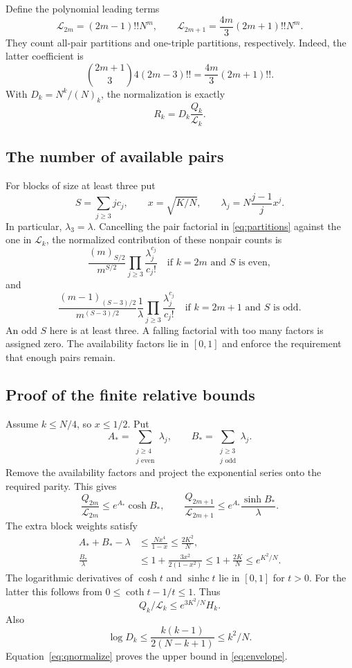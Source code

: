 \documentclass[11pt]{article}
\theoremstyle{definition}
\theoremstyle{remark}
\newcommand{\1}{\mathbf 1}
\newcommand{\shc}{\operatorname{sinhc}}
\begin{document}
Define the polynomial leading terms
\[
\mathcal L_{2m}=(2m-1)!!N^m,\qquad
\mathcal L_{2m+1}=\frac{4m}{3}(2m+1)!!N^m.
\]
They count all-pair partitions and one-triple partitions, respectively. Indeed, the latter coefficient is
\[
\binom{2m+1}{3}4(2m-3)!!=\frac{4m}{3}(2m+1)!!.
\]
With $D_k=N^k/(N)_k$, the normalization is exactly
\begin{equation}\label{eq:qnormalize}
R_k=D_k\frac{Q_k}{\mathcal L_k}.
\end{equation}

\subsection{The number of available pairs}

For blocks of size at least three put
\[
S=\sum_{j\ge3}jc_j,\qquad x=\sqrt{K/N},\qquad
\lambda_j=N\frac{j-1}{j}x^j.
\]
In particular, $\lambda_3=\lambda$. Cancelling the pair factorial in \eqref{eq:partitions} against the one in $\mathcal L_k$, the normalized contribution of these nonpair counts is
\begin{equation}\label{eq:availabilityeven}
\frac{(m)_{S/2}}{m^{S/2}}
\prod_{j\ge3}\frac{\lambda_j^{c_j}}{c_j!}
\quad\text{if }k=2m\text{ and }S\text{ is even},
\end{equation}
and
\begin{equation}\label{eq:availabilityodd}
\frac{(m-1)_{(S-3)/2}}{m^{(S-3)/2}}
\frac1\lambda\prod_{j\ge3}\frac{\lambda_j^{c_j}}{c_j!}
\quad\text{if }k=2m+1\text{ and }S\text{ is odd}.
\end{equation}
An odd $S$ here is at least three. A falling factorial with too many factors is assigned zero. The availability factors lie in $[0,1]$ and enforce the requirement that enough pairs remain.

\subsection{Proof of the finite relative bounds}

Assume $k\le N/4$, so $x\le1/2$. Put
\[
A_* =\sum_{\substack{j\ge4\\j\text{ even}}}\lambda_j,
\qquad B_* =\sum_{\substack{j\ge3\\j\text{ odd}}}\lambda_j.
\]
Remove the availability factors and project the exponential series onto the required parity. This gives
\[
\frac{Q_{2m}}{\mathcal L_{2m}}\le e^{A_*}\cosh B_*,\qquad
\frac{Q_{2m+1}}{\mathcal L_{2m+1}}\le e^{A_*}\frac{\sinh B_*}{\lambda}.
\]
The extra block weights satisfy
\begin{align*}
A_*+B_*-\lambda&\le\frac{Nx^4}{1-x}\le\frac{2K^2}N,\\
\frac{B_*}{\lambda}&\le1+\frac{3x^2}{2(1-x^2)}
\le1+\frac{2K}N\le e^{K^2/N}.
\end{align*}
The logarithmic derivatives of $\cosh t$ and $\shc t$ lie in $[0,1]$ for $t>0$. For the latter this follows from $0\le\coth t-1/t\le1$. Thus
\[
Q_k/\mathcal L_k\le e^{3K^2/N}H_k.
\]
Also
\[
\log D_k\le\frac{k(k-1)}{2(N-k+1)}\le k^2/N.
\]
Equation~\eqref{eq:qnormalize} proves the upper bound in \eqref{eq:envelope}.
\end{document}
